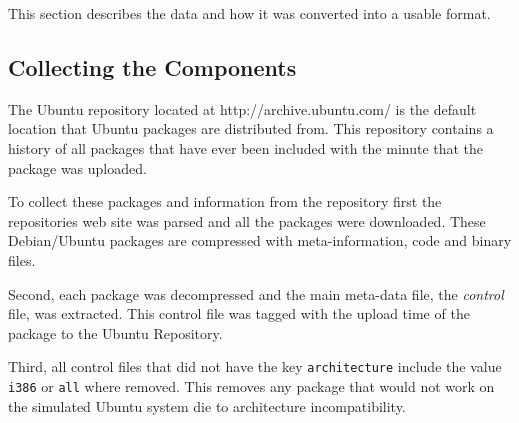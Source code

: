 This section describes the data and how it was converted into a usable format.

\subsection{Collecting the Components}
The Ubuntu repository located at http://archive.ubuntu.com/ is the default location that Ubuntu packages are distributed from.
This repository contains a history of all packages that have ever been included with the minute that the package was uploaded.

To collect these packages and information from the repository first the repositories web site was parsed and all the packages were downloaded.
These Debian/Ubuntu packages are compressed with meta-information, code and binary files.

Second, each package was decompressed and the main meta-data file, the \textit{control} file, was extracted.
This control file was tagged with the upload time of the package to the Ubuntu Repository.

Third, all control files that did not have the key \verb+architecture+  include the value \verb+i386+ or \verb+all+ where removed.
This removes any package that would not work on the simulated Ubuntu system die to architecture incompatibility.

